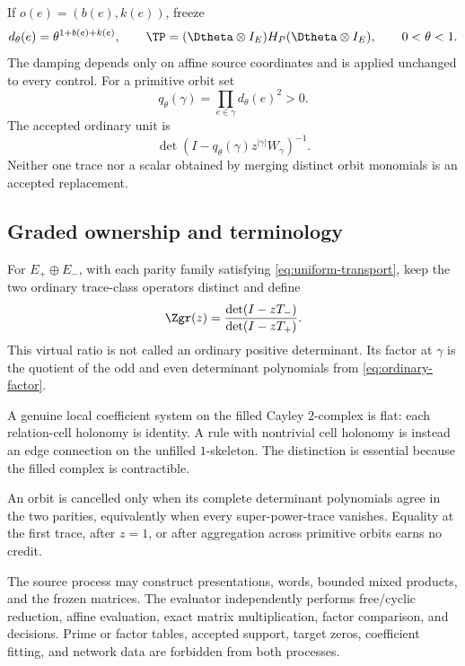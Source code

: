 If $o(e)=(b(e),k(e))$, freeze
\begin{equation}
  d_\theta(e)=\theta^{1+b(e)+k(e)},\qquad
  \TP=(\Dtheta\otimes I_E)H_P(\Dtheta\otimes I_E),
  \qquad 0<\theta<1.
  \label{eq:matrix-operator}
\end{equation}
The damping depends only on affine source coordinates and is applied unchanged
to every control.  For a primitive orbit set
\begin{equation}
  q_\theta(\gamma)=\prod_{e\in\gamma}d_\theta(e)^2>0.
  \label{eq:orbit-weight}
\end{equation}
The accepted ordinary unit is
\begin{equation}
  \det\!\left(I-q_\theta(\gamma)z^{|\gamma|}W_\gamma\right)^{-1}.
  \label{eq:ordinary-factor}
\end{equation}
Neither one trace nor a scalar obtained by merging distinct orbit monomials is
an accepted replacement.

\subsection{Graded ownership and terminology}

For $E_+\oplus E_-$, with each parity family satisfying
\cref{eq:uniform-transport}, keep the two ordinary trace-class operators distinct and
define
\begin{equation}
  \Zgr(z)=\frac{\det(I-zT_-)}{\det(I-zT_+)}.
  \label{eq:graded-ratio}
\end{equation}
This virtual ratio is not called an ordinary positive determinant.  Its
factor at $\gamma$ is the quotient of the odd and even determinant
polynomials from \cref{eq:ordinary-factor}.

A genuine local coefficient system on the filled Cayley $2$-complex is flat:
each relation-cell holonomy is identity.  A rule with nontrivial cell
holonomy is instead an edge connection on the unfilled $1$-skeleton.  The
distinction is essential because the filled complex is contractible.

\begin{convention}
An orbit is cancelled only when its complete determinant polynomials agree in
the two parities, equivalently when every super-power-trace vanishes.  Equality
at the first trace, after $z=1$, or after aggregation across primitive orbits
earns no credit.
\end{convention}

The source process may construct presentations, words, bounded mixed products,
and the frozen matrices.  The evaluator independently performs free/cyclic
reduction, affine evaluation, exact matrix multiplication, factor comparison,
and decisions.  Prime or factor tables, accepted support, target zeros,
coefficient fitting, and network data are forbidden from both processes.
